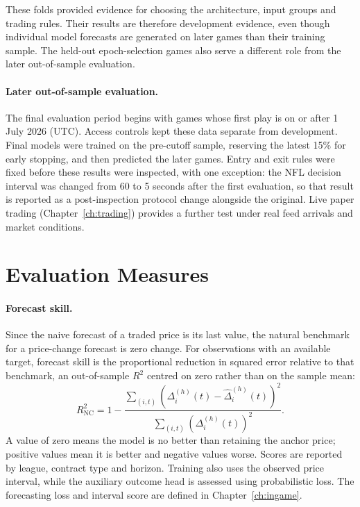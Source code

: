 \documentclass[12pt,a4paper,oneside]{report}
\begin{document}
These folds provided evidence for choosing the architecture, input groups and
trading rules. Their results are therefore development evidence, even though
individual model forecasts are generated on later games than their training
sample. The held-out epoch-selection games also serve a different role from the
later out-of-sample evaluation.

\paragraph{Later out-of-sample evaluation.}
The final evaluation period begins with games whose first play is on or after
1 July 2026 (UTC). Access controls kept these data separate from development.
Final models were trained on the
pre-cutoff sample, reserving the latest 15\% for early stopping, and then
predicted the later games. Entry and exit rules were fixed before these
results were inspected, with one exception: the NFL decision interval
was changed from 60 to 5 seconds after the first evaluation, so that result is
reported as a post-inspection protocol change alongside the original. Live paper
trading (Chapter~\ref{ch:trading}) provides a further test under real feed
arrivals and market conditions.

\section{Evaluation Measures}\label{sec:data-metrics}
\paragraph{Forecast skill.}
Since the naive forecast of a traded price is its last value, the natural
benchmark for a price-change forecast is zero change. For observations with an
available target, forecast skill is the proportional reduction in squared error
relative to that benchmark, an out-of-sample $R^2$ centred on zero rather than on
the sample mean:
\begin{equation}
 R^2_{\mathrm{NC}}=
 1-\frac{\sum_{(i,t)}\left(\Delta_i^{(h)}(t)-\widehat\Delta_i^{(h)}(t)\right)^2}
          {\sum_{(i,t)}\left(\Delta_i^{(h)}(t)\right)^2}.
\end{equation}
A value of zero means the model is no better than retaining the anchor price;
positive values mean it is better and negative values worse. Scores are
reported by league, contract type and horizon. Training also uses the observed
price interval, while the auxiliary outcome head is assessed using probabilistic
loss. The forecasting loss and interval score are defined in
Chapter~\ref{ch:ingame}.
\end{document}
